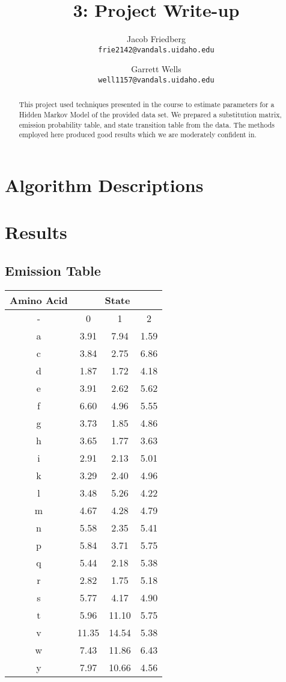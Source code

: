 \documentclass{article}
\title{3: Project Write-up}
\author{
Jacob Friedberg \\
\texttt{frie2142@vandals.uidaho.edu}
\and
Garrett Wells \\
\texttt{well1157@vandals.uidaho.edu}
}
\begin{document}
\maketitle
\begin{abstract}
    This project used techniques presented in the course to estimate parameters for a Hidden Markov Model of the provided data set. We prepared a substitution matrix, emission probability table, and state transition table from the data. The methods employed here produced good results which we are moderately confident in.
\end{abstract}

\section{Algorithm Descriptions}


\section{Results}


\subsection{Emission Table}

\begin{tabular}{|c|c  c  c|}
    \hline
    \textbf{Amino Acid} & \multicolumn{3}{|c|}{\textbf{State}} \\
    \hline
    -  &  0 & 1 & 2 \\
    \hline
    a & 3.91 & 7.94 & 1.59 \\
    \hline
    c & 3.84 & 2.75 & 6.86 \\
    \hline
    d & 1.87 & 1.72 & 4.18 \\
    \hline
    e & 3.91 & 2.62 & 5.62 \\
    \hline
    f & 6.60 & 4.96 & 5.55 \\
    \hline
    g & 3.73 & 1.85 & 4.86 \\
    \hline
    h & 3.65 & 1.77 & 3.63 \\
    \hline
    i & 2.91 & 2.13 & 5.01 \\
    \hline
    k & 3.29 & 2.40 & 4.96 \\
    \hline
    l & 3.48 & 5.26 & 4.22 \\
    \hline
    m & 4.67 & 4.28 & 4.79 \\
    \hline
    n & 5.58 & 2.35 & 5.41 \\
    \hline
    p & 5.84 & 3.71 & 5.75 \\
    \hline
    q & 5.44 & 2.18 & 5.38 \\
    \hline
    r & 2.82 & 1.75 & 5.18 \\
    \hline
    s & 5.77 & 4.17 & 4.90 \\
    \hline
    t & 5.96 & 11.10 & 5.75 \\
    \hline
    v & 11.35 & 14.54 & 5.38 \\
    \hline
    w & 7.43 & 11.86 & 6.43 \\
    \hline
    y & 7.97 & 10.66 & 4.56 \\
    \hline
\end{tabular}
\end{document}
